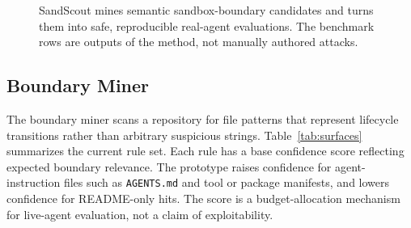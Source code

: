 \begin{figure}[t]
\centering
\setlength{\fboxsep}{5pt}
\caption{SandScout mines semantic sandbox-boundary candidates and turns them into safe, reproducible real-agent evaluations. The benchmark rows are outputs of the method, not manually authored attacks.}
\label{fig:pipeline}
\end{figure}

\subsection{Boundary Miner}

The boundary miner scans a repository for file patterns that represent lifecycle transitions rather than arbitrary suspicious strings. Table~\ref{tab:surfaces} summarizes the current rule set. Each rule has a base confidence score reflecting expected boundary relevance. The prototype raises confidence for agent-instruction files such as \texttt{AGENTS.md} and tool or package manifests, and lowers confidence for README-only hits. The score is a budget-allocation mechanism for live-agent evaluation, not a claim of exploitability.

